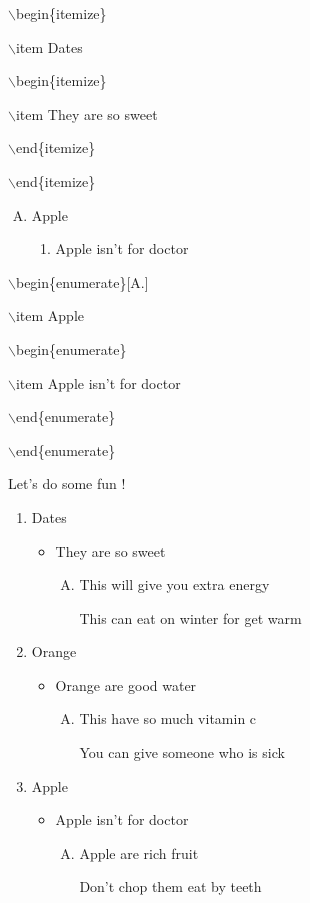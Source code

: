\documentclass[11pt]{article}
\begin{document}
$\backslash$begin\{itemize\}

$\backslash$item Dates

$\backslash$begin\{itemize\}

$\backslash$item They are so sweet

$\backslash$end\{itemize\}

$\backslash$end\{itemize\}

\vspace{1cm}

\begin{enumerate}[A.]
\item Apple
\begin{enumerate}
\item Apple isn't for doctor
\end{enumerate}
\end{enumerate}

$\backslash$begin\{enumerate\}[A.]

$\backslash$item Apple

$\backslash$begin\{enumerate\}

$\backslash$item Apple isn't for doctor

$\backslash$end\{enumerate\}

$\backslash$end\{enumerate\}

\vspace{1cm}

Let's do some fun !

\begin{enumerate}
\item Dates
\begin{itemize}
\item They are so sweet
\begin{enumerate}[A.]
\item This will give you extra energy
\item[This can eat on winter for get warm]
\end{enumerate}
\end{itemize}
\item Orange
\begin{itemize}
\item Orange are good water
\begin{enumerate}[A.]
\item This have so much vitamin c
\item[You can give someone who is sick]
\end{enumerate}
\end{itemize}
\item Apple
\begin{itemize}
\item Apple isn't for doctor
\begin{enumerate}[A.]
\item Apple are rich fruit
\item[Don't chop them eat by teeth]
\end{enumerate}
\end{itemize}
\end{enumerate}
\end{document}
